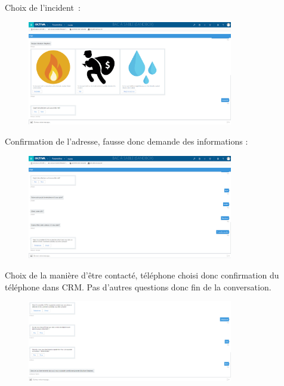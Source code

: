Choix de l’incident :
\vspace{1em}

\begin{figure}[ht]
	\centering
		\includegraphics[width = 0.8\textwidth]{2.png}
\end{figure}

Confirmation de l’adresse, fausse donc demande des informations :
\vspace{1em}

\begin{figure}[ht]
	\centering
		\includegraphics[width = 0.8\textwidth]{3.png}
\end{figure}


Choix de la manière d’être contacté, téléphone choisi donc confirmation du téléphone dans CRM. Pas d’autres questions donc fin de la conversation.
\vspace{1em}

\begin{figure}[ht]
	\centering
		\includegraphics[width = 0.8\textwidth]{finConv.png}
\end{figure}